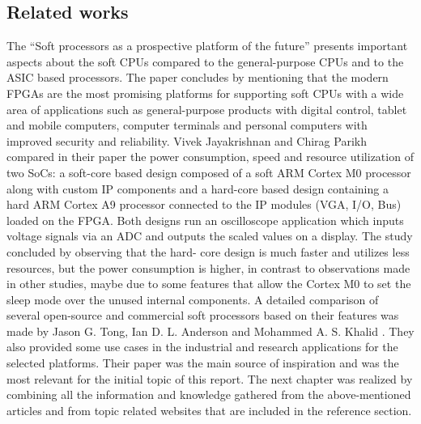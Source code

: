 \subsection{Related works}
\hspace{0.5cm} The “Soft processors as a prospective platform of the future” presents important aspects
about the soft CPUs compared to the general-purpose CPUs and to the ASIC based
processors. The paper concludes by mentioning that the modern FPGAs are the most
promising platforms for supporting soft CPUs with a wide area of applications such as
general-purpose products with digital control, tablet and mobile computers, computer
terminals and personal computers with improved security and reliability. Vivek Jayakrishnan
and Chirag Parikh compared in their paper \cite{Jayakrishnan2019} the power consumption, speed and resource
utilization of two SoCs: a soft-core based design composed of a soft ARM Cortex M0
processor along with custom IP components and a hard-core based design containing a hard
ARM Cortex A9 processor connected to the IP modules (VGA, I/O, Bus) loaded on the
FPGA. Both designs run an oscilloscope application which inputs voltage signals via an ADC
and outputs the scaled values on a display. The study concluded by observing that the hard-
core design is much faster and utilizes less resources, but the power consumption is higher, in
contrast to observations made in other studies, maybe due to some features that allow the
Cortex M0 to set the sleep mode over the unused internal components. A detailed comparison
of several open-source and commercial soft processors based on their features was made by
Jason G. Tong, Ian D. L. Anderson and Mohammed A. S. Khalid \cite{tong2007}. They also provided some
use cases in the industrial and research applications for the selected platforms. Their paper
was the main source of inspiration and was the most relevant for the initial topic of this
report.
The next chapter was realized by combining all the information and knowledge gathered
from the above-mentioned articles and from topic related websites that are included in the
reference section.